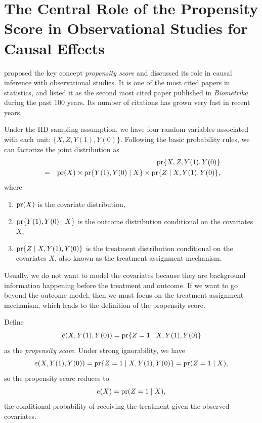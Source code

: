 
\chapter{The Central Role of the Propensity Score in Observational Studies for Causal Effects}\label{chapter::pscore-key}
 
 
\citet{rosenbaum1983central}   proposed the key concept {\it propensity score} and discussed its role in causal inference with observational studies. It is one of the most cited papers in statistics, and \citet{titterington2013biometrika} listed it as the second most cited paper published in {\it Biometrika} during the past 100 years. Its number of citations has grown very fast in recent years. 


Under the IID sampling assumption, we have four random variables associated with each unit: $\{  X, Z, Y(1), Y(0) \} $. Following the basic probability rules, we can factorize the joint distribution as 
\begin{eqnarray*}
&&\textup{pr} \{  X, Z, Y(1), Y(0) \}  \\
 &=& \textup{pr}(X)  
\times   \textup{pr}\{ Y(1), Y(0) \mid X \}   
 \times  \textup{pr}\{  Z\mid X, Y(1), Y(0)  \} ,
\end{eqnarray*}
where
\begin{enumerate}
\item
 $\textup{pr}(X)$ is the covariate distribution, 
 \item
 $\textup{pr}\{ Y(1), Y(0) \mid X \}$ is the outcome distribution conditional on the covariates $X$,
 \item
 $\textup{pr}\{  Z\mid X, Y(1), Y(0)  \}$ is the treatment distribution conditional on the covariates $X$, also known as the treatment assignment mechanism. 
\end{enumerate}
Usually, we do not want to model the covariates because they are background information happening before the treatment and outcome. If we want to go beyond the outcome model, then we must focus on the treatment assignment mechanism, which leads to the definition of the propensity score.

\begin{definition}
\label{def::pscore}
Define
$$
e(X, Y(1), Y(0)   ) = \textup{pr}\{  Z=1\mid X, Y(1), Y(0)  \}
$$
as the {\it propensity score}. Under strong ignorability, we have
$$
 e(X, Y(1), Y(0)   )  = \textup{pr}\{  Z=1\mid X, Y(1), Y(0)  \} = \textup{pr}(Z=1 \mid X),
$$
so the propensity score reduces to 
$$
e(X) = \textup{pr}(Z=1 \mid X),
$$
the conditional probability of receiving the treatment given the observed covariates.  
\end{definition} 

